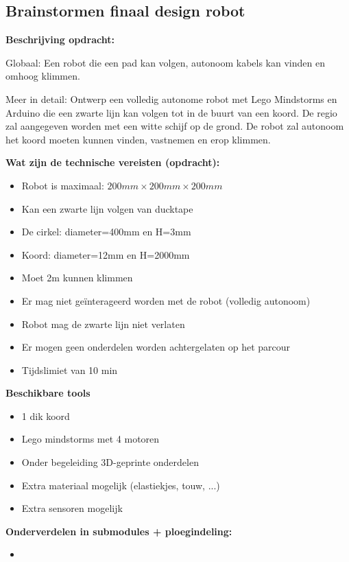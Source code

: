 \subsection{Brainstormen finaal design robot}%
\label{sub:Brainstormen finaal design robot}

\textbf{Beschrijving opdracht:}

Globaal: Een robot die een pad kan volgen, autonoom kabels kan vinden en omhoog
klimmen.

Meer in detail: Ontwerp een volledig autonome robot met Lego Mindstorms en Arduino
die een zwarte lijn kan volgen tot in de buurt van een koord. De regio zal aangegeven
worden met een witte schijf op de grond. De robot zal autonoom het koord moeten 
kunnen vinden, vastnemen en erop klimmen.

\textbf{Wat zijn de technische vereisten (opdracht):}
\begin{itemize}
	\item Robot is maximaal: $200mm\times 200mm\times 200mm$
	\item Kan een zwarte lijn volgen van ducktape
	\item De cirkel: diameter=400mm en H=3mm
	\item Koord: diameter=12mm en H=2000mm
	\item Moet 2m kunnen klimmen
	\item Er mag niet ge\"interageerd worden met de robot (volledig autonoom)
	\item Robot mag de zwarte lijn niet verlaten
	\item Er mogen geen onderdelen worden achtergelaten op het parcour
	\item Tijdslimiet van 10 min
\end{itemize}

\textbf{Beschikbare tools} 
\begin{itemize}
	\item 1 dik koord
	\item Lego mindstorms met 4 motoren
	\item Onder begeleiding 3D-geprinte onderdelen
	\item Extra materiaal mogelijk (elastiekjes, touw, ...)
	\item Extra sensoren mogelijk 
\end{itemize}

\textbf{Onderverdelen in submodules + ploegindeling:} 
\begin{itemize}
	\item 
\end{itemize}

